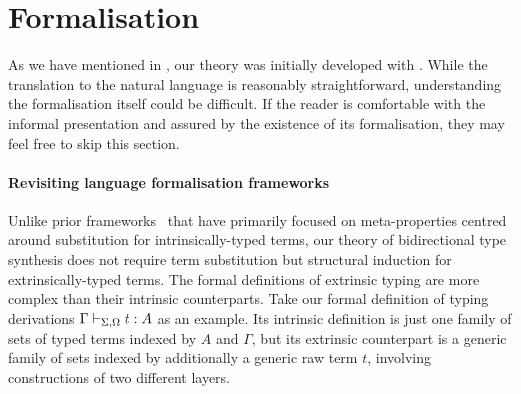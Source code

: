 \documentclass[BiSig.tex]{subfiles}
\begin{document}
\section{Formalisation} \label{sec:formalisation}
As we have mentioned in , our theory was initially developed with \Agda.
While the translation to the natural language is reasonably straightforward, understanding the formalisation itself could be difficult.
If the reader is comfortable with the informal presentation and assured by the existence of its formalisation, they may feel free to skip this section.

\paragraph{Revisiting language formalisation frameworks}
Unlike prior frameworks~\citep{Allais2021,Fiore2022,Ahrens2022} that have primarily focused on meta-properties centred around substitution for intrinsically-typed terms, our theory of bidirectional type synthesis does not require term substitution but structural induction for extrinsically-typed terms.
The formal definitions of extrinsic typing are more complex than their intrinsic counterparts.
Take our formal definition of typing derivations $\Gamma \vdash_{\Sigma, \Omega} \isTerm{t} : A$ as an example.
Its intrinsic definition is just one family of sets of typed terms indexed by $A$ and $\Gamma$, but its extrinsic counterpart is a generic family of sets indexed by additionally a generic raw term $t$, involving constructions of two different layers.
\end{document}
